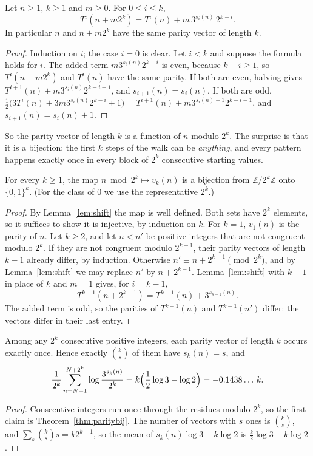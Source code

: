 \begin{lemma}\label{lem:shift}
Let $n\ge1$, $k\ge1$ and $m\ge0$. For $0\le i\le k$,
\[
T^i(n+m2^k)=T^i(n)+m\,3^{s_i(n)}\,2^{k-i}.
\]
In particular $n$ and $n+m2^k$ have the same parity vector of length $k$.
\end{lemma}
\begin{proof}
Induction on $i$; the case $i=0$ is clear. Let $i<k$ and suppose the formula holds for $i$. The added term $m3^{s_i(n)}2^{k-i}$ is even, because
$k-i\ge1$, so $T^i(n+m2^k)$ and $T^i(n)$ have the same parity. If both are even, halving gives $T^{i+1}(n)+m3^{s_i(n)}2^{k-i-1}$, and
$s_{i+1}(n)=s_i(n)$. If both are odd, $\frac12\bigl(3T^i(n)+3m3^{s_i(n)}2^{k-i}+1\bigr)=T^{i+1}(n)+m3^{s_i(n)+1}2^{k-i-1}$, and
$s_{i+1}(n)=s_i(n)+1$.
\end{proof}

So the parity vector of length $k$ is a function of $n$ modulo $2^k$. The surprise is that it is a bijection: the first $k$ steps of the walk can be
\emph{anything}, and every pattern happens exactly once in every block of $2^k$ consecutive starting values.

\begin{theorem}\label{thm:paritybij}
For every $k\ge1$, the map $n\bmod2^k\mapsto v_k(n)$ is a bijection from $\mathbb Z/2^k\mathbb Z$ onto $\{0,1\}^k$. (For the class of $0$ we use the
representative $2^k$.)
\end{theorem}
\begin{proof}
By Lemma~\ref{lem:shift} the map is well defined. Both sets have $2^k$ elements, so it suffices to show it is injective, by induction on $k$. For $k=1$,
$v_1(n)$ is the parity of $n$. Let $k\ge2$, and let $n<n'$ be positive integers that are not congruent modulo $2^k$. If they are not congruent modulo
$2^{k-1}$, their parity vectors of length $k-1$ already differ, by induction. Otherwise $n'\equiv n+2^{k-1}\pmod{2^k}$, and by Lemma~\ref{lem:shift} we may
replace $n'$ by $n+2^{k-1}$. Lemma~\ref{lem:shift} with $k-1$ in place of $k$ and $m=1$ gives, for $i=k-1$,
\[
T^{k-1}(n+2^{k-1})=T^{k-1}(n)+3^{s_{k-1}(n)}.
\]
The added term is odd, so the parities of $T^{k-1}(n)$ and $T^{k-1}(n')$ differ: the vectors differ in their last entry.
\end{proof}

\begin{corollary}\label{cor:coins}
Among any $2^k$ consecutive positive integers, each parity vector of length $k$ occurs exactly once. Hence exactly $\binom ks$ of them have $s_k(n)=s$, and
\[
\frac1{2^k}\sum_{n=N+1}^{N+2^k}\log\frac{3^{s_k(n)}}{2^k}=k\Bigl(\frac12\log3-\log2\Bigr)=-0.1438\ldots\,k.
\]
\end{corollary}
\begin{proof}
Consecutive integers run once through the residues modulo $2^k$, so the first claim is Theorem~\ref{thm:paritybij}. The number of vectors with $s$ ones is
$\binom ks$, and $\sum_s\binom ks s=k2^{k-1}$, so the mean of $s_k(n)\log3-k\log2$ is $\frac k2\log3-k\log2$.
\end{proof}

